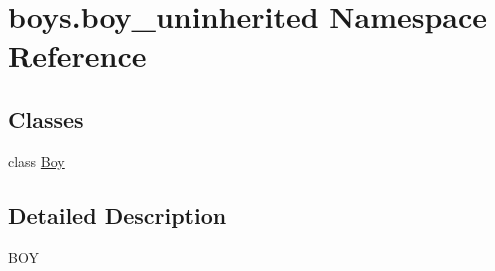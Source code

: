 \hypertarget{namespaceboys_1_1boy__uninherited}{}\section{boys.\+boy\+\_\+uninherited Namespace Reference}
\label{namespaceboys_1_1boy__uninherited}
\subsection*{Classes}
\begin{DoxyCompactItemize}
\item 
class \hyperlink{classboys_1_1boy__uninherited_1_1_boy}{Boy}
\end{DoxyCompactItemize}


\subsection{Detailed Description}
\begin{DoxyVerb}BOY\end{DoxyVerb}
 